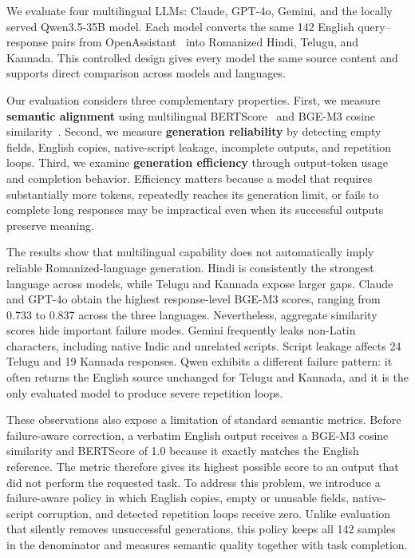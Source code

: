 We evaluate four multilingual LLMs: Claude, GPT-4o, Gemini, and the locally
served Qwen3.5-35B model. Each model converts the same 142 English
query--response pairs from OpenAssistant~\cite{kopf2023openassistant} into
Romanized Hindi, Telugu, and Kannada. This controlled design gives every model
the same source content and supports direct comparison across models and
languages.

Our evaluation considers three complementary properties. First, we measure
\textbf{semantic alignment} using multilingual
BERTScore~\cite{zhang2020bertscore} and BGE-M3 cosine
similarity~\cite{chen2024bgem3}. Second, we measure
\textbf{generation reliability} by detecting empty fields, English copies,
native-script leakage, incomplete outputs, and repetition loops. Third, we
examine \textbf{generation efficiency} through output-token usage and completion
behavior. Efficiency matters because a model that requires substantially more
tokens, repeatedly reaches its generation limit, or fails to complete long
responses may be impractical even when its successful outputs preserve meaning.

The results show that multilingual capability does not automatically imply
reliable Romanized-language generation. Hindi is consistently the strongest
language across models, while Telugu and Kannada expose larger gaps. Claude and
GPT-4o obtain the highest response-level BGE-M3 scores, ranging from 0.733 to
0.837 across the three languages. Nevertheless, aggregate similarity scores
hide important failure modes. Gemini frequently leaks non-Latin characters,
including native Indic and unrelated scripts. Script leakage affects 24 Telugu
and 19 Kannada responses. Qwen exhibits a different failure pattern: it often
returns the English source unchanged for Telugu and Kannada, and it is the only
evaluated model to produce severe repetition loops.

These observations also expose a limitation of standard semantic metrics.
Before failure-aware correction, a verbatim English output receives a BGE-M3
cosine similarity and BERTScore of 1.0 because it exactly matches the English
reference. The metric therefore gives its highest possible score to an output
that did not perform the requested task. To address this problem, we introduce
a failure-aware policy in which English copies, empty or unusable fields,
native-script corruption, and detected repetition loops receive zero. Unlike
evaluation that silently removes unsuccessful generations, this policy keeps
all 142 samples in the denominator and measures semantic quality together with
task completion.

